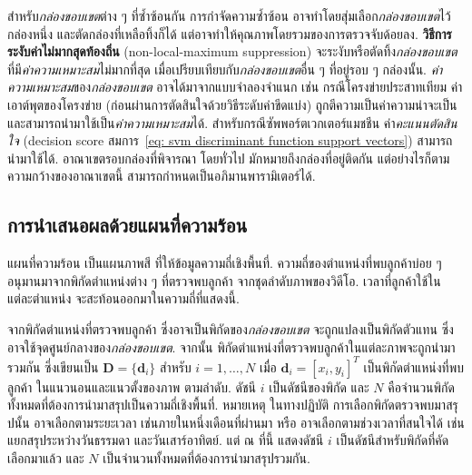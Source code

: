 สำหรับ\textit{กล่องขอบเขต}ต่าง ๆ ที่ซ้ำซ้อนกัน
การกำจัดความซ้ำซ้อน อาจทำโดยสุ่มเลือก\textit{กล่องขอบเขต}ไว้กล่องหนึ่ง และตัดกล่องที่เหลือทิ้งก็ได้
แต่อาจทำให้คุณภาพโดยรวมของการตรวจจับด้อยลง.
\textbf{วิธีการระงับค่าไม่มากสุดท้องถิ่น} (non-local-maximum suppression\cite{MalisiewiczEtAl2011a})
%
จะระงับหรือตัดทิ้ง\textit{กล่องขอบเขต} 
ที่มี\textit{ค่าความเหมาะสม}ไม่มากที่สุด เมื่อเปรียบเทียบกับ\textit{กล่องขอบเขต}อื่น ๆ ที่อยู่รอบ ๆ กล่องนั้น.
\textit{ค่าความเหมาะสม}ของ\textit{กล่องขอบเขต} อาจได้มาจากแบบจำลองจำแนก
เช่น 
กรณีโครงข่ายประสาทเทียม ค่าเอาต์พุตของโครงข่าย (ก่อนผ่านการตัดสินใจด้วยวิธีระดับค่าขีดแบ่ง)
ถูกตีความเป็นค่าความน่าจะเป็น และสามารถนำมาใช้เป็น\textit{ค่าความเหมาะสม}ได้.
สำหรับกรณีซัพพอร์ตเวกเตอร์แมชชีน
ค่า\textit{คะแนนตัดสินใจ} (decision score สมการ~\ref{eq: svm discriminant function support vectors})
สามารถนำมาใช้ได้.
อาณาเขตรอบกล่องที่พิจารณา
โดยทั่วไป มักหมายถึงกล่องที่อยู่ติดกัน
แต่อย่างไรก็ตาม ความกว้างของอาณาเขตนี้ สามารถกำหนดเป็นอภิมานพารามิเตอร์ได้.

\subsection{การนำเสนอผลด้วยแผนที่ความร้อน}
\label{sec: classic heat map}

แผนที่ความร้อน เป็นแผนภาพสี ที่ให้ข้อมูลความถี่เชิงพื้นที่.
ความถี่ของตำแหน่งที่พบลูกค้าบ่อย ๆ อนุมานมาจากพิกัดตำแหน่งต่าง ๆ ที่ตรวจพบลูกค้า จากชุดลำดับภาพของวิดีโอ.
เวลาที่ลูกค้าใช้ในแต่ละตำแหน่ง จะสะท้อนออกมาในความถี่ที่แสดงนี้.

จากพิกัดตำแหน่งที่ตรวจพบลูกค้า ซึ่งอาจเป็นพิกัดของ\textit{กล่องขอบเขต} จะถูกแปลงเป็นพิกัดตัวแทน
ซึ่งอาจใช้จุดศูนย์กลางของ\textit{กล่องขอบเขต}.
จากนั้น พิกัดตำแหน่งที่ตรวจพบลูกค้าในแต่ละภาพจะถูกนำมารวมกัน ซึ่งเขียนเป็น $\bm{D} = \{\bm{d}_i\}$
สำหรับ $i=1,\ldots, N$ เมื่อ $\bm{d}_i = [x_i, y_i]^T$ เป็นพิกัดตำแหน่งที่พบลูกค้า ในแนวนอนและแนวตั้งของภาพ ตามลำดับ.
ดัชนี $i$ เป็นดัชนีของพิกัด และ $N$ คือจำนวนพิกัดทั้งหมดที่ต้องการนำมาสรุปเป็นความถี่เชิงพื้นที่.
หมายเหตุ ในทางปฏิบัติ การเลือกพิกัดตรวจพบมาสรุปนั้น อาจเลือกตามระยะเวลา เช่นภายในหนึ่งเดือนที่ผ่านมา 
หรือ อาจเลือกตามช่วงเวลาที่สนใจได้ เช่นแยกสรุประหว่างวันธรรมดา และวันเสาร์อาทิตย์.
แต่ ณ ที่นี้ แสดงดัชนี $i$ เป็นดัชนีสำหรับพิกัดที่คัดเลือกมาแล้ว และ $N$ เป็นจำนวนทั้งหมดที่ต้องการนำมาสรุปรวมกัน.

